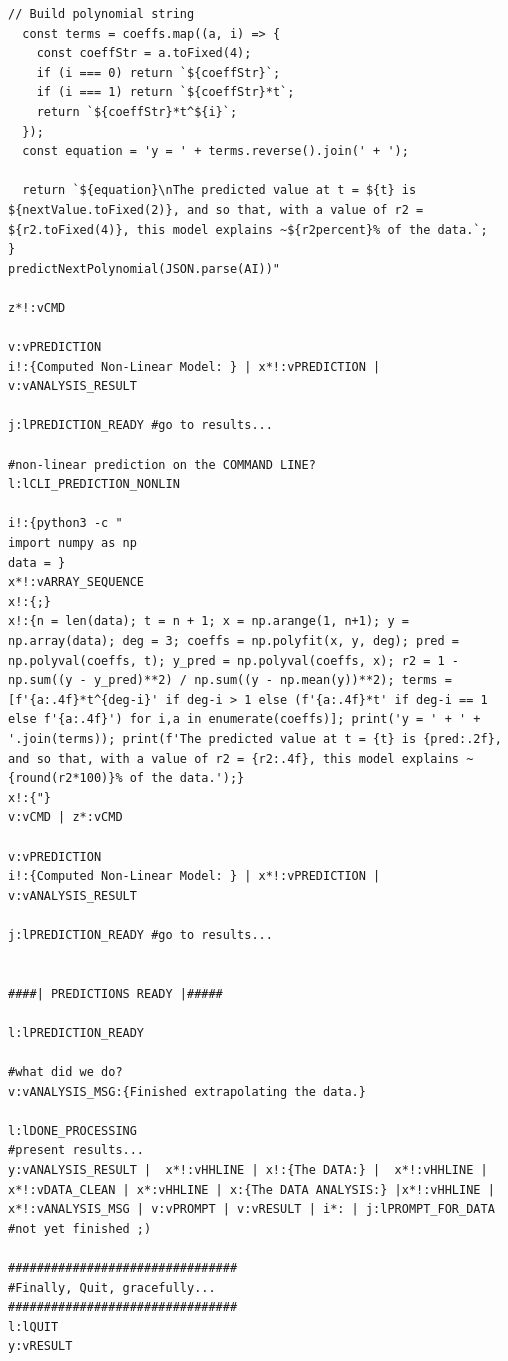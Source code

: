 \documentclass[a4paper, 18pt]{book} %
\begin{document}
{\begin{tcolorbox}[teaterminalstyle, title=TEA Program:  Statistical Analysis Tool (SAT), breakable]
\begin{lstlisting}[language=TEA,breaklines=true,]
  // Build polynomial string
  const terms = coeffs.map((a, i) => {
    const coeffStr = a.toFixed(4);
    if (i === 0) return `${coeffStr}`;
    if (i === 1) return `${coeffStr}*t`;
    return `${coeffStr}*t^${i}`;
  });
  const equation = 'y = ' + terms.reverse().join(' + ');

  return `${equation}\nThe predicted value at t = ${t} is ${nextValue.toFixed(2)}, and so that, with a value of r2 = ${r2.toFixed(4)}, this model explains ~${r2percent}% of the data.`;
}
predictNextPolynomial(JSON.parse(AI))"

z*!:vCMD

v:vPREDICTION
i!:{Computed Non-Linear Model: } | x*!:vPREDICTION |
v:vANALYSIS_RESULT

j:lPREDICTION_READY #go to results...

#non-linear prediction on the COMMAND LINE?
l:lCLI_PREDICTION_NONLIN

i!:{python3 -c "
import numpy as np
data = }
x*!:vARRAY_SEQUENCE
x!:{;}
x!:{n = len(data); t = n + 1; x = np.arange(1, n+1); y = np.array(data); deg = 3; coeffs = np.polyfit(x, y, deg); pred = np.polyval(coeffs, t); y_pred = np.polyval(coeffs, x); r2 = 1 - np.sum((y - y_pred)**2) / np.sum((y - np.mean(y))**2); terms = [f'{a:.4f}*t^{deg-i}' if deg-i > 1 else (f'{a:.4f}*t' if deg-i == 1 else f'{a:.4f}') for i,a in enumerate(coeffs)]; print('y = ' + ' + '.join(terms)); print(f'The predicted value at t = {t} is {pred:.2f}, and so that, with a value of r2 = {r2:.4f}, this model explains ~{round(r2*100)}% of the data.');}
x!:{"}
v:vCMD | z*:vCMD

v:vPREDICTION
i!:{Computed Non-Linear Model: } | x*!:vPREDICTION |
v:vANALYSIS_RESULT

j:lPREDICTION_READY #go to results...


####| PREDICTIONS READY |#####

l:lPREDICTION_READY

#what did we do?
v:vANALYSIS_MSG:{Finished extrapolating the data.}

l:lDONE_PROCESSING
#present results...
y:vANALYSIS_RESULT |  x*!:vHHLINE | x!:{The DATA:} |  x*!:vHHLINE |
x*!:vDATA_CLEAN | x*:vHHLINE | x:{The DATA ANALYSIS:} |x*!:vHHLINE | x*!:vANALYSIS_MSG | v:vPROMPT | v:vRESULT | i*: | j:lPROMPT_FOR_DATA #not yet finished ;)

################################
#Finally, Quit, gracefully...
################################
l:lQUIT
y:vRESULT
   \end{lstlisting}
  \end{tcolorbox}
  \label{FIGNEX2}
  \vspace{1cm}
  
}
\end{document}
